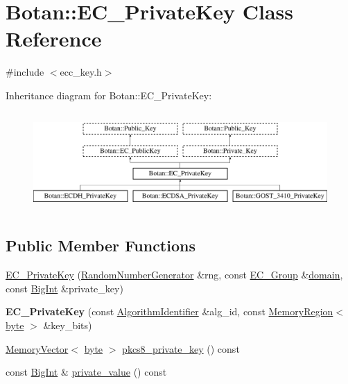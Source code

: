 \hypertarget{classBotan_1_1EC__PrivateKey}{\section{Botan\-:\-:E\-C\-\_\-\-Private\-Key Class Reference}
\label{classBotan_1_1EC__PrivateKey}
}


{\ttfamily \#include $<$ecc\-\_\-key.\-h$>$}

Inheritance diagram for Botan\-:\-:E\-C\-\_\-\-Private\-Key\-:\begin{figure}[H]
\begin{center}
\leavevmode
\includegraphics[height=3.809524cm]{classBotan_1_1EC__PrivateKey}
\end{center}
\end{figure}
\subsection*{Public Member Functions}
\begin{DoxyCompactItemize}
\item 
\hyperlink{classBotan_1_1EC__PrivateKey_a5e1a1ddecce290f34a0fcc297e56b6f2}{E\-C\-\_\-\-Private\-Key} (\hyperlink{classBotan_1_1RandomNumberGenerator}{Random\-Number\-Generator} \&rng, const \hyperlink{classBotan_1_1EC__Group}{E\-C\-\_\-\-Group} \&\hyperlink{classBotan_1_1EC__PublicKey_a5fe61411ec55d30d9cf0c36116223a71}{domain}, const \hyperlink{classBotan_1_1BigInt}{Big\-Int} \&private\-\_\-key)
\item 
\hypertarget{classBotan_1_1EC__PrivateKey_a9c0bb4e20749fd96b30e001906eb0941}{{\bfseries E\-C\-\_\-\-Private\-Key} (const \hyperlink{classBotan_1_1AlgorithmIdentifier}{Algorithm\-Identifier} \&alg\-\_\-id, const \hyperlink{classBotan_1_1MemoryRegion}{Memory\-Region}$<$ \hyperlink{namespaceBotan_a7d793989d801281df48c6b19616b8b84}{byte} $>$ \&key\-\_\-bits)}\label{classBotan_1_1EC__PrivateKey_a9c0bb4e20749fd96b30e001906eb0941}

\item 
\hyperlink{classBotan_1_1MemoryVector}{Memory\-Vector}$<$ \hyperlink{namespaceBotan_a7d793989d801281df48c6b19616b8b84}{byte} $>$ \hyperlink{classBotan_1_1EC__PrivateKey_a33b5aea3c19944e5f48554fb8cce3e59}{pkcs8\-\_\-private\-\_\-key} () const 
\item 
const \hyperlink{classBotan_1_1BigInt}{Big\-Int} \& \hyperlink{classBotan_1_1EC__PrivateKey_ac225229ffd67f220f38c916534889c42}{private\-\_\-value} () const 
\end{DoxyCompactItemize}
